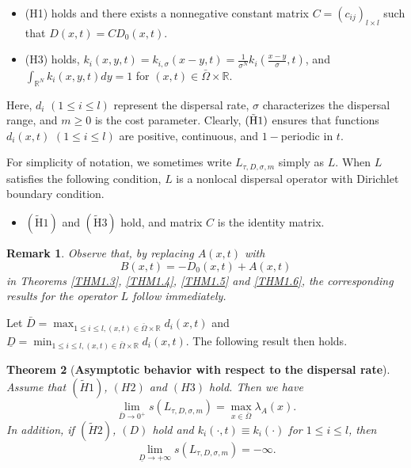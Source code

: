\documentclass[11pt,reqno]{amsart}
\newtheorem{theorem}{Theorem}[section]
\newtheorem{remark}[theorem]{Remark}
\numberwithin{equation}{section}
\begin{document}
\begin{itemize}[leftmargin=0.9cm]

\item[$\mathrm{(\tilde{H}1)}$]
(H1) holds and there exists a nonnegative constant matrix $C=(c_{ij})_{l\times l}$
such that
$D(x,t)= C D_{0}(x,t)$.

\item[$\mathrm{(\tilde{H}3)}$]
(H3) holds,
$k_{i}(x,y,t) = k_{i,\sigma}(x-y,t) =\frac{1}{\sigma^{N}} k_{i}\left(\frac{x-y}{\sigma} ,t \right)$,
and $\int_{\mathbb{R}^{N}} k_{i}(x,y,t) dy =1$ for $(x,t)\in \bar{\Omega}\times \mathbb{R}$.
\end{itemize}
Here, $d_{i}$ $(1\leq i \leq l)$ represent the dispersal rate, $\sigma$ characterizes the dispersal range, and $m\geq 0$ is the cost parameter.
Clearly, ${\rm (\tilde{H}1) }$ ensures that functions $d_{i}(x,t)$ $(1\leq i \leq l)$ are positive, continuous, and $1-$periodic in $t$.

For simplicity of notation, we sometimes write $L_{\tau,D,\sigma,m}$ simply as $L$.
When $L$ satisfies the following condition, $L$ is a nonlocal dispersal operator with Dirichlet boundary condition.
\begin{itemize} [leftmargin=0.8cm]
\item[(D)] $\mathrm{(\tilde{H}1)}$ and $\mathrm{(\tilde{H}3)}$ hold, and matrix $C$ is the identity matrix.
\end{itemize}


\begin{remark}\label{REMARK1}{\rm
Observe that, by replacing $A(x,t)$ with
\begin{equation*}
B(x,t) = -D_{0}(x,t) + A(x,t)
\end{equation*}
in Theorems \ref{THM1.3}, \ref{THM1.4}, \ref{THM1.5} and \ref{THM1.6},
the corresponding results for the operator $L$ follow immediately.
}
\end{remark}

Let $\bar{D} = \max_{1\leq i \leq l, (x,t)\in\bar{\Omega}\times\mathbb{R}}d_{i}(x,t)$
and
$\underline{D} = \min_{1\leq i \leq l, (x,t)\in\bar{\Omega}\times\mathbb{R}}d_{i}(x,t)$. The following result then holds.


\begin{theorem}[\textbf{Asymptotic behavior with respect to the dispersal rate}]\label{THM1.7}
Assume that $(\tilde{H}1)$, $(H2)$ and $(H3) $ hold. Then we have
\begin{equation*}
\lim_{ \bar{D} \to 0^{+}} s(L_{\tau,D,\sigma,m}) = \max_{x \in \bar{\Omega}} \lambda_{A}(x).
\end{equation*}
In addition, if $(\tilde{H}2)$, $(D)$ hold and $k_{i}(\cdot,t) \equiv k_{i}(\cdot)$ for $1 \leq i \leq l$, then
\begin{equation*}
\lim_{ \underline{D} \to +\infty} s(L_{\tau,D,\sigma,m}) = -\infty.
\end{equation*}
\end{theorem}
\end{document}
